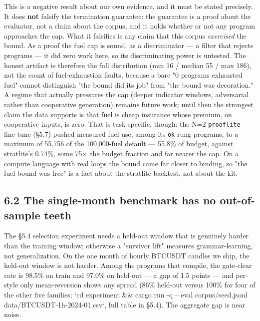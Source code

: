 \documentclass[11pt]{article}
\newcommand{\code}[1]{\texttt{#1}}
\begin{document}
This is a negative result about our own evidence, and it must be stated
precisely. It does \textbf{not} falsify the termination guarantee: the guarantee is a
proof about the evaluator, not a claim about the corpus, and it holds whether or
not any program approaches the cap. What it falsifies is any claim that this
corpus \emph{exercised} the bound. As a proof the fuel cap is sound; as a
discriminator --- a filter that rejects programs --- it did zero work here, so its
discriminating power is untested. The honest artifact is therefore the full
distribution (min 16 / median 55 / max 186), not the count of fuel-exhaustion
faults, because a bare "0 programs exhausted fuel" cannot distinguish "the bound
did its job" from "the bound was decoration." A regime that actually pressures
the cap (deeper indicator windows, adversarial rather than cooperative
generation) remains future work; until then the strongest claim the data
supports is that fuel is cheap insurance whose premium, on cooperative inputs,
is zero. That is task-specific, though: the N=2 \code{prooflite} fine-tune (\S{}5.7)
pushed measured fuel use, among its \code{ok}-rung programs, to a maximum of 55,756
of the 100,000-fuel default --- 55.8\% of budget, against stratlite's 0.74\%, some
75$\times$ the budget fraction and far nearer the cap. On a compute language with real loops the
bound came far closer to binding, so "the fuel bound was free" is a fact about
the stratlite backtest, not about the kit.

\subsection*{6.2 The single-month benchmark has no out-of-sample teeth}

The \S{}5.4 selection experiment needs a held-out window that is genuinely harder
than the training window; otherwise a "survivor lift" measures grammar-learning,
not generalization. On the one month of hourly BTCUSDT candles we ship, the
held-out window is not harder. Among the programs that compile, the gate-clear
rate is 98.5\% on train and 97.0\% on held-out --- a gap of 1.5 points --- and
per-style only mean-reversion shows any spread (86\% held-out versus 100\% for
four of the other five families; `cd experiment \&\& cargo run -q -- eval
corpus/seed.jsonl data/BTCUSDT-1h-2024-01.csv`, full table in \S{}5.4). The
aggregate gap is near noise.
\end{document}
